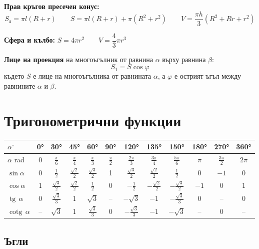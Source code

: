 \documentclass[12pt,a4paper]{article}
\renewcommand{\tg}{\operatorname{tg}}
\newcommand{\cotg}{\operatorname{cotg}}
\begin{document}
\textbf{Прав кръгов пресечен конус:}
$$S_{\text{л}}=\pi l(R+r) \qquad S=\pi l(R+r)+\pi(R^2+r^2) \qquad V=\frac{\pi h}{3}\left(R^2+Rr+r^2\right)$$

\textbf{Сфера и кълбо:} \quad $S=4\pi r^2 \qquad V=\dfrac43\pi r^3$

\textbf{Лице на проекция} на многоъгълник от равнина $\alpha$ върху равнина $\beta$:
$$S_1=S\cos\varphi$$
където $S$ е лице на многоъгълника от равнината $\alpha$, а $\varphi$ е острият ъгъл между равнините $\alpha$ и $\beta$.

\newpage
\section{Тригонометрични функции}

\begin{center}
\renewcommand{\arraystretch}{1.6}
\begin{tabular}{l*{11}{c}}
\toprule
$\alpha^\circ$ & 0° & 30° & 45° & 60° & 90° & 120° & 135° & 150° & 180° & 270° & 360° \\
\midrule
$\alpha$ rad & 0 & $\frac{\pi}{6}$ & $\frac{\pi}{4}$ & $\frac{\pi}{3}$ & $\frac{\pi}{2}$ & $\frac{2\pi}{3}$ & $\frac{3\pi}{4}$ & $\frac{5\pi}{6}$ & $\pi$ & $\frac{3\pi}{2}$ & $2\pi$ \\
$\sin\alpha$ & 0 & $\frac12$ & $\frac{\sqrt2}{2}$ & $\frac{\sqrt3}{2}$ & 1 & $\frac{\sqrt3}{2}$ & $\frac{\sqrt2}{2}$ & $\frac12$ & 0 & $-1$ & 0 \\
$\cos\alpha$ & 1 & $\frac{\sqrt3}{2}$ & $\frac{\sqrt2}{2}$ & $\frac12$ & 0 & $-\frac12$ & $-\frac{\sqrt2}{2}$ & $-\frac{\sqrt3}{2}$ & $-1$ & 0 & 1 \\
$\tg\,\alpha$ & 0 & $\frac{\sqrt3}{3}$ & 1 & $\sqrt3$ & -- & $-\sqrt3$ & $-1$ & $-\frac{\sqrt3}{3}$ & 0 & -- & 0 \\
$\cotg\,\alpha$ & -- & $\sqrt3$ & 1 & $\frac{\sqrt3}{3}$ & 0 & $-\frac{\sqrt3}{3}$ & $-1$ & $-\sqrt3$ & -- & 0 & -- \\
\bottomrule
\end{tabular}
\end{center}

\subsection{Ъгли}
\end{document}
